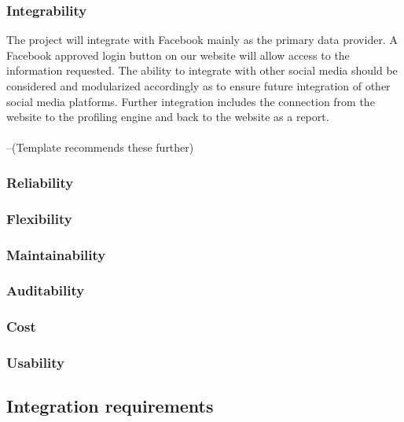 \documentclass{article}
\begin{document}
		\subsubsection{Integrability}
		The project will integrate with Facebook mainly as the primary data provider.
		A Facebook approved login button on our website will allow access to the information requested. The ability to integrate with other social media should be considered and modularized accordingly as to ensure future integration of other social media platforms.
		Further integration includes the connection from the website to the profiling engine and back to the website as a report.
		\\
		\\
		--(Template recommends these further)
		\subsubsection{Reliability}
		\subsubsection{Flexibility}
		\subsubsection{Maintainability}
		\subsubsection{Auditability}
		\subsubsection{Cost}
		\subsubsection{Usability}

		

	\subsection{Integration requirements}
	
\end{document}
